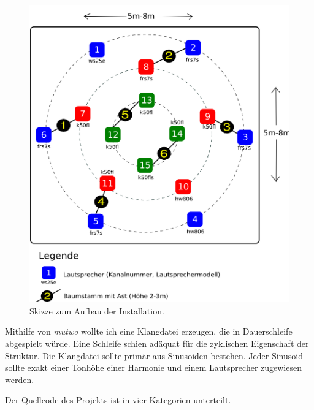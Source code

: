 \documentclass[12pt,a4paper,ngerman]{article}
\begin{document}
\begin{figure}[h!]
        \hspace{0.5cm}
        \includegraphics[scale=0.185]{pictures/setup-thanatos-trees.png}
    \caption{%
        Skizze zum Aufbau der Installation.
    }
\end{figure}

Mithilfe von \emph{mutwo} wollte ich eine Klangdatei erzeugen, die in Dauerschleife abgespielt würde.
Eine Schleife schien adäquat für die zyklischen Eigenschaft der Struktur.
Die Klangdatei sollte primär aus Sinusoiden bestehen.
Jeder Sinusoid sollte exakt einer Tonhöhe einer Harmonie und einem Lautsprecher zugewiesen werden.

\smallskip

Der Quellcode des Projekts ist in vier Kategorien unterteilt.
\end{document}
